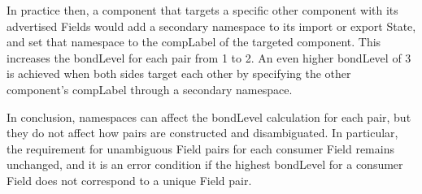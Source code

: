 In practice then, a component that targets a specific other component with its advertised Fields would add a secondary namespace to its import or export State, and set that namespace to the compLabel of the targeted component. This increases the bondLevel for each pair from 1 to 2. An even higher bondLevel of 3 is achieved when both sides target each other by specifying the other component's compLabel through a secondary namespace.

In conclusion, namespaces can affect the bondLevel calculation for each pair, but they do not affect how pairs are constructed and disambiguated. In particular, the requirement for unambiguous Field pairs for each consumer Field remains unchanged, and it is an error condition if the highest bondLevel for a consumer Field does not correspond to a unique Field pair.

